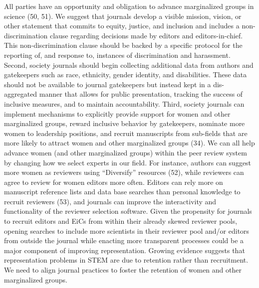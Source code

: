 \documentclass[11pt,]{article}
\begin{document}
All parties have an opportunity and obligation to advance marginalized
groups in science (50, 51). We suggest that journals develop a visible
mission, vision, or other statement that commits to equity, justice, and
inclusion and includes a non-discrimination clause regarding decisions
made by editors and editors-in-chief. This non-discrimination clause
should be backed by a specific protocol for the reporting of, and
response to, instances of discrimination and harassment. Second, society
journals should begin collecting additional data from authors and
gatekeepers such as race, ethnicity, gender identity, and disabilities.
These data should not be available to journal gatekeepers but instead
kept in a dis-aggregated manner that allows for public presentation,
tracking the success of inclusive measures, and to maintain
accountability. Third, society journals can implement mechanisms to
explicitly provide support for women and other marginalized groups,
reward inclusive behavior by gatekeepers, nominate more women to
leadership positions, and recruit manuscripts from sub-fields that are
more likely to attract women and other marginalized groups (34). We can
all help advance women (and other marginalized groups) within the peer
review system by changing how we select experts in our field. For
instance, authors can suggest more women as reviewers using
``Diversify'' resources (52), while reviewers can agree to review for
women editors more often. Editors can rely more on manuscript reference
lists and data base searches than personal knowledge to recruit
reviewers (53), and journals can improve the interactivity and
functionality of the reviewer selection software. Given the propensity
for journals to recruit editors and EiCs from within their already
skewed reviewer pools, opening searches to include more scientists in
their reviewer pool and/or editors from outside the journal while
enacting more transparent processes could be a major component of
improving representation. Growing evidence suggests that representation
problems in STEM are due to retention rather than recruitment. We need
to align journal practices to foster the retention of women and other
marginalized groups.
\end{document}
